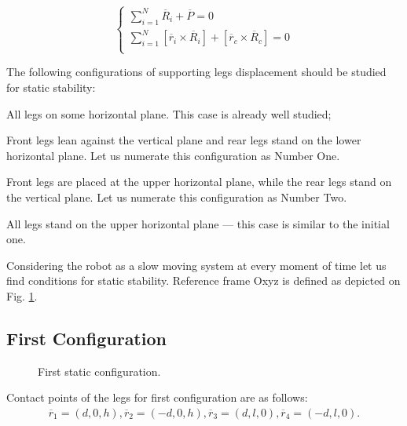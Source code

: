 \documentclass{ws-procs9x6}
\begin{document}
\begin{equation}
  \left\{
    \begin{array}{cc}
    \sum\limits^N_{i=1}\overline{R}_i + \overline{P} = 0\\
    \sum\limits^N_{i=1}[\overline{r}_i\times\overline{R}_i] + [\overline{r}_c\times\overline{R}_c] = 0\\
    \end{array}
  \right.
  \label{eq:eq1}
\end{equation}

  
The following configurations of supporting legs displacement should be studied for static stability:
\begin{itemlist}
  \item All legs on some horizontal plane. This case is already well studied;
  \item Front legs lean against the vertical plane and rear legs stand on the lower horizontal plane. Let us numerate this configuration as Number One.
  \item Front legs are placed at the upper horizontal plane, while the rear legs stand on the vertical plane. Let us numerate this configuration as Number Two.
  \item All legs stand on the upper horizontal plane –-- this case is similar to the initial one.
\end{itemlist}
  
  Considering the robot as a slow moving system at every moment of time let us find conditions for static stability. 
  Reference frame Oxyz is defined as depicted on Fig. \ref{aba:configuration_1}.

\subsection{First Configuration}

\begin{figure}
  \begin{center}
  \end{center}
  \caption{First static configuration.}
  \label{aba:configuration_1}
\end{figure}

Contact points of the legs for first configuration are as follows:
\begin{equation}
  \begin{array}{l}
    \overline{r}_1 = (d,0,h),
    \overline{r}_2 = (-d,0,h),
    \overline{r}_3 = (d,l,0),
    \overline{r}_4 = (-d,l,0).
  \end{array}
\end{equation}
\end{document}
